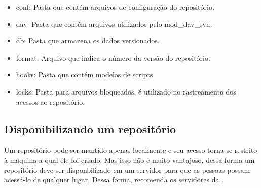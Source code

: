 \begin{itemize}

\item conf: Pasta que contém arquivos de configuração do repositório.

\item dav: Pasta que contém arquivos utilizados pelo mod\_dav\_svn.

\item db: Pasta que armazena os dados versionados.

\item format: Arquivo que indica o número da versão do repositório.

\item hooks: Pasta que contém modelos de scripts

\item locks: Pasta para arquivos bloqueados, é utilizado no rastreamento dos acessos ao repositório.

\end{itemize}

\subsection{Disponibilizando um repositório}

Um repositório pode ser mantido apenas localmente e seu acesso torna-se restrito à máquina a qual ele foi criado. Mas isso não é muito vantajoso, dessa forma um repositório deve ser disponbilizado em um servidor para que as pessoas possam acessá-lo de qualquer lugar. Dessa forma, \cite{svn-book} recomenda os servidores da \label{tab:servidores}.
 
